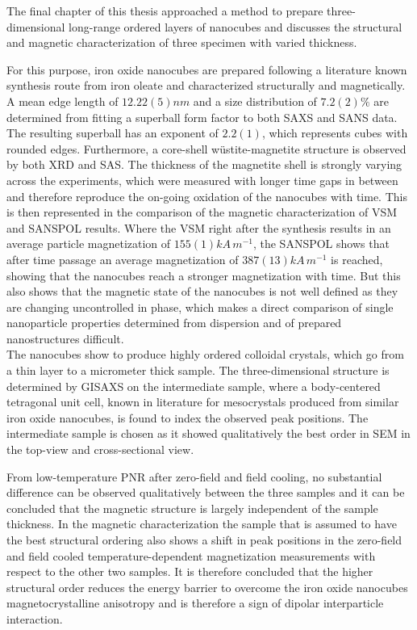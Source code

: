\documentclass[\main/dresen_thesis.tex]{subfiles}
\begin{document}
  The final chapter of this thesis approached a method to prepare three-dimensional long-range ordered layers of nanocubes and discusses the structural and magnetic characterization of three specimen with varied thickness.

  For this purpose, iron oxide nanocubes are prepared following a literature known synthesis route from iron oleate and characterized structurally and magnetically.
  A mean edge length of $12.22(5) \unit{nm}$ and a size distribution of $7.2(2) \%$ are determined from fitting a superball form factor to both SAXS and SANS data.
  The resulting superball has an exponent of $2.2(1)$, which represents cubes with rounded edges.
  Furthermore, a core-shell w\"ustite-magnetite structure is observed by both XRD and SAS.
  The thickness of the magnetite shell is strongly varying across the experiments, which were measured with longer time gaps in between and therefore reproduce the on-going oxidation of the nanocubes with time.
  This is then represented in the comparison of the magnetic characterization of VSM and SANSPOL results.
  Where the VSM right after the synthesis results in an average particle magnetization of $155(1) \unit{kA\, m^{-1}}$, the SANSPOL shows that after time passage an average magnetization of $387(13) \unit{kA \, m^{-1}}$ is reached, showing that the nanocubes reach a stronger magnetization with time.
  But this also shows that the magnetic state of the nanocubes is not well defined as they are changing uncontrolled in phase, which makes a direct comparison of single nanoparticle properties determined from dispersion and of prepared nanostructures difficult.
  \\

  The nanocubes show to produce highly ordered colloidal crystals, which go from a thin layer to a micrometer thick sample.
  The three-dimensional structure is determined by GISAXS on the intermediate sample, where a body-centered tetragonal unit cell, known in literature for mesocrystals produced from similar iron oxide nanocubes, is found to index the observed peak positions.
  The intermediate sample is chosen as it showed qualitatively the best order in SEM in the top-view and cross-sectional view.

  From low-temperature PNR after zero-field and field cooling, no substantial difference can be observed qualitatively between the three samples and it can be concluded that the magnetic structure is largely independent of the sample thickness.
  In the magnetic characterization the sample that is assumed to have the best structural ordering also shows a shift in peak positions in the zero-field and field cooled temperature-dependent magnetization measurements with respect to the other two samples.
  It is therefore concluded that the higher structural order reduces the energy barrier to overcome the iron oxide nanocubes magnetocrystalline anisotropy and is therefore a sign of dipolar interparticle interaction.
  \\
\end{document}
